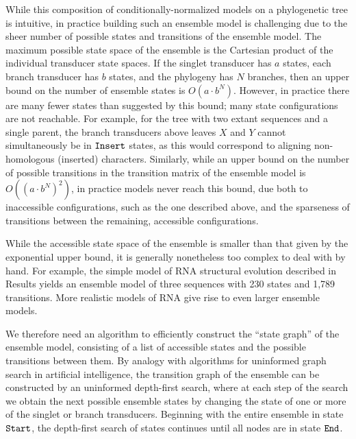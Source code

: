 \documentclass[10pt]{article}
\begin{document}
While this composition of conditionally-normalized models on a
phylogenetic tree is intuitive, in practice building such an ensemble
model is challenging due to the sheer number of possible states and
transitions of the ensemble model.
The maximum possible state space of the ensemble is the Cartesian product of the
individual transducer state spaces. If the singlet transducer has $a$
states, each branch transducer has $b$ states, and the phylogeny has $N$
branches, then an upper bound on the number of
ensemble states is $O(a \cdot b^N)$.
However, in practice there are many fewer states than suggested by
this bound; many state configurations are not reachable.  For example,
for the tree with two extant sequences and a single parent,
the branch transducers above leaves $X$ and $Y$ cannot simultaneously
be in $\mathtt{Insert}$ states, as this would correspond to aligning
non-homologous (inserted) characters.
Similarly, while an upper bound on the number of possible transitions
in the transition matrix of the ensemble model is $O((a \cdot b^N)^2)$,
in practice models never reach this bound,
due both to inaccessible configurations, such as the one described above,
and the sparseness of transitions between the remaining, accessible configurations.

While the accessible state space of the ensemble is smaller than that
given by the exponential upper bound, it is generally nonetheless too
complex to deal with by hand.
For example, the simple model of RNA structural evolution described in
Results yields an ensemble model of three sequences with 230 states
and 1,789 transitions.  More realistic models of RNA give rise to even
larger ensemble models.

We therefore need an algorithm to efficiently construct the ``state graph'' of the
ensemble model, consisting of a list of accessible states and the
possible transitions between them. 
By analogy with algorithms for uninformed graph search in artificial
intelligence, the transition graph of the ensemble can be constructed
by an uninformed depth-first search, where at each step of the search
we obtain the next possible ensemble states by changing the state of one or
more of the singlet or branch transducers. Beginning with the entire
ensemble in state $\mathtt{Start}$, the depth-first search of states
continues until all nodes are in state $\mathtt{End}$.
\end{document}
